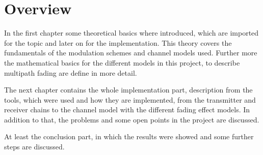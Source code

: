 \section{Overview}

In the first chapter some theoretical basics where introduced, which are imported for the topic and later on for the implementation. This theory covers the fundamentals of the modulation schemes and channel models used. Further more the mathematical basics for the different models in this project, to describe multipath fading are define in more detail.  

The next chapter contains the whole implementation part, description from the tools, which were used and how they are implemented, from the 
transmitter and receiver chains to the channel model with the different fading effect models. In addition to that, the problems and some open points in the project are discussed. 

At least the conclusion part, in which the results were showed and some further steps are discussed. 


